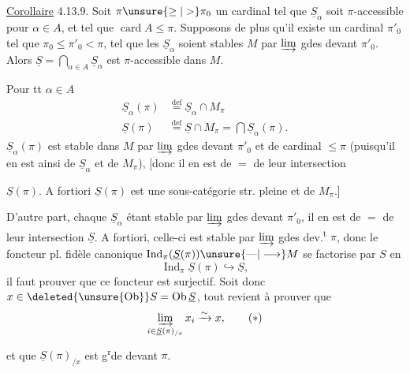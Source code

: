 \uline{Corollaire} 4.13.9. Soit $\pi\unsure{\geq|>}\pi_0$ un cardinal
tel que $\underline S_\alpha$ soit $\pi$-accessible  pour 
$\alpha\in A$, et tel que $\operatorname{card} A\leq\pi$. Supposons
de plus qu'il  existe un cardinal
$\pi'_0$ \deleted{$\unsure{\geq}$} tel que $\pi_0\leq\pi'_0<\pi$, tel que les
$\underline S_\alpha$ soient stables  $M$ par $\varinjlim$ gdes
devant $\pi'_0$. Alors $\underline S=\bigcap_{\alpha\in A}\underline S_\alpha$ est $\pi$-accessible dans $M$.

Pour tt $\alpha\in A$
\[
\begin{aligned}
\underline S_\alpha(\pi)&\overset{\mathrm{def}}{=}\underline S_\alpha\cap M_\pi\\
\underline S(\pi)&\overset{\mathrm{def}}{=}\underline S\cap M_\pi=\bigcap\underline S_\alpha(\pi).
\end{aligned}
\]
  $\underline S_\alpha(\pi)$ est stable dans $M$
par $\varinjlim$ gdes devant $\pi'_0$ et de cardinal
$\leq\pi$ (puisqu'il en est ainsi de $\underline S_\alpha$ et de
$M_\pi$), [donc il en est de $=$ de leur intersection

$\underline S(\pi)$. A fortiori $\underline S(\pi)$ est une sous-catégorie
str. pleine et  de $M_\pi$.]

 D'autre part, chaque $\underline S_\alpha$ étant stable  par
$\varinjlim$ gdes devant $\pi'_0$, il en est de $=$ de
leur intersection $\underline S$. A fortiori, celle-ci
est stable par $\varinjlim$ gdes dev.\textsuperscript{t} $\pi$, donc
le foncteur pl. fidèle canonique
$\operatorname{Ind}_\pi(\underline S(\pi))\unsure{\text{---}|\longrightarrow}M$ se factorise par $S$
en
\[
\operatorname{Ind}_\pi\underline S(\pi)\hookrightarrow\underline S,
\]
il faut prouver que ce foncteur est
 surjectif. Soit donc $x\in\deleted{\unsure{\operatorname{Ob}}}S=\operatorname{Ob}\underline S$,
tout revient à prouver que
\[
\varinjlim_{i\in\underline S(\pi)_{/x}}x_i\xrightarrow{\sim}x,\tag*{$(*)$}
\]
et que $\underline S(\pi)_{/x}$ est g\textsuperscript{r}de devant $\pi$.

